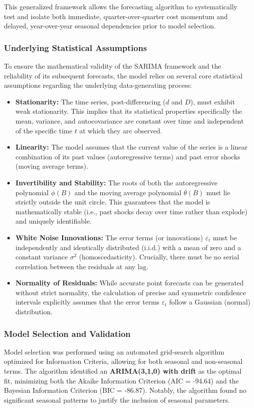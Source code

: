 This generalized framework allows the forecasting algorithm to systematically test and isolate both immediate, quarter-over-quarter cost momentum and delayed, year-over-year seasonal dependencies prior to model selection.
\subsubsection{Underlying Statistical Assumptions}
To ensure the mathematical validity of the SARIMA framework and the reliability of its subsequent forecasts, the model relies on several core statistical assumptions regarding the underlying data-generating process:

\begin{itemize}
    \item \textbf{Stationarity:} The time series, post-differencing ($d$ and $D$), must exhibit weak stationarity. This implies that its statistical properties specifically the mean, variance, and autocovariance are constant over time and independent of the specific time $t$ at which they are observed.
    \item \textbf{Linearity:} The model assumes that the current value of the series is a linear combination of its past values (autoregressive terms) and past error shocks (moving average terms).
    \item \textbf{Invertibility and Stability:} The roots of both the autoregressive polynomial $\phi(B)$ and the moving average polynomial $\theta(B)$ must lie strictly outside the unit circle. This guarantees that the model is mathematically stable (i.e., past shocks decay over time rather than explode) and uniquely identifiable.
    \item \textbf{White Noise Innovations:} The error terms (or innovations) $\varepsilon_t$ must be independently and identically distributed (i.i.d.) with a mean of zero and a constant variance $\sigma^2$ (homoscedasticity). Crucially, there must be no serial correlation between the residuals at any lag.
    \item \textbf{Normality of Residuals:} While accurate point forecasts can be generated without strict normality, the calculation of precise and symmetric confidence intervals explicitly assumes that the error terms $\varepsilon_t$ follow a Gaussian (normal) distribution.
\end{itemize}
\subsubsection{Model Selection and Validation}
Model selection was performed using an automated grid-search algorithm optimized for Information Criteria, allowing for both seasonal and non-seasonal terms. The algorithm identified an \textbf{ARIMA(3,1,0) with drift} as the optimal fit, minimizing both the Akaike Information Criterion  (AIC = -94.64) and the Bayesian Information Criterion  (BIC = -86.87). Notably, the algorithm found no significant seasonal patterns to justify the inclusion of seasonal parameters.

